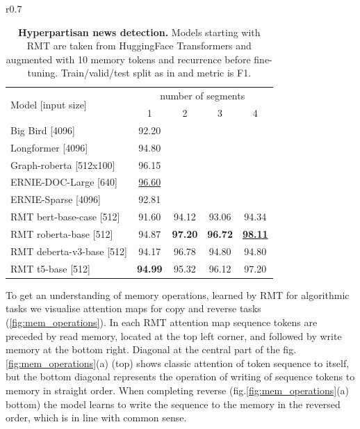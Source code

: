   \begin{table}{r}{0.7\linewidth}
  \vspace{-0.2in}
  \caption{\small \textbf{Hyperpartisan news detection.} Models starting with RMT are taken from HuggingFace Transformers and augmented with 10 memory tokens and recurrence before fine-tuning. Train/valid/test split as in \cite{beltagy2020longformer} and metric is F1.}
  \label{tab:hyp}
  \begin{center}
  \begin{small}
  \begin{sc}
  \fontsize{7}{8}
  \selectfont 
  \begin{tabular}{lcccc}
  \toprule
  \multirow{2}{*}{Model [input size]} & \multicolumn{4}{c}{number of segments} \\
  & 1 & 2 & 3 & 4 \\
  \midrule
  Big Bird [4096] \cite{zaheer2020big} &  92.20 & & & \\
  Longformer [4096] \cite{beltagy2020longformer} &  94.80 & & & \\
  Graph-roberta [512x100] \cite{xu2021contrastive} &  96.15 & & & \\
  ERNIE-DOC-Large [640] \cite{ding-etal-2021-ernie-doc} &  \underline{96.60} & & & \\
  ERNIE-Sparse [4096] \cite{liu2022ernie} &  92.81 & & & \\
  \midrule[0.1pt]
  RMT bert-base-case [512] &  91.60 & 94.12 & 93.06 & 94.34 \\
  RMT roberta-base [512] &  94.87 & \textbf{97.20} & \textbf{96.72} & \underline{\textbf{98.11}} \\
  RMT deberta-v3-base [512] &  94.17 & 96.78 & 94.80 & 94.80 \\
  RMT t5-base [512] &  \textbf{94.99} & 95.32 & 96.12 & 97.20 \\
  \bottomrule
  \end{tabular}
  \end{sc}
  \end{small}
  \end{center}
  \vskip -0.2in
  \end{table}
  
  
  To get an understanding of memory operations, learned by RMT for algorithmic tasks we visualise attention maps for copy and reverse tasks (\cref{fig:mem_operations}). In each RMT attention map sequence tokens are preceded by read memory, located at the top left corner, and followed by write memory at the bottom right. Diagonal at the central part of the fig.\ref{fig:mem_operations}(a) (top)  shows classic attention of token sequence to itself, but the bottom diagonal represents the operation of writing of sequence tokens to memory in straight order. When completing reverse (fig.\ref{fig:mem_operations}(a) bottom)  the model learns to write the sequence to the memory in the reversed order, which is in line with common sense.
  
